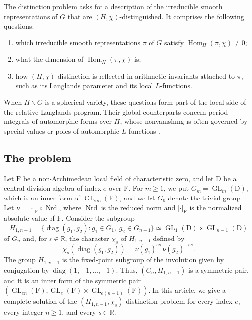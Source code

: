 \documentclass[11pt]{amsart}
\numberwithin{equation}{section}
\theoremstyle{plain}
\theoremstyle{definition}
\theoremstyle{remark}
\newcommand{\R}{\mathbb{R}}
\DeclareMathOperator{\GL}{GL}
\DeclareMathOperator{\Hom}{Hom}
\DeclareMathOperator{\Nrd}{Nrd}
\DeclareMathOperator{\diag}{diag}
\begin{document}
The distinction problem asks for a description of the irreducible smooth representations of $G$ that are $(H,\chi)$-distinguished. It comprises the following questions:
\begin{enumerate}[label=\textup{(\roman*)}]
\item which irreducible smooth representations $\pi$ of $G$ satisfy $\Hom_H(\pi,\chi)\ne0$;
\item what the dimension of $\Hom_H(\pi,\chi)$ is;
\item how $(H,\chi)$-distinction is reflected in arithmetic invariants attached to $\pi$, such as its Langlands parameter and its local $L$-functions.
\end{enumerate}
When $H\backslash G$ is a spherical variety, these questions form part of the local side of the relative Langlands program. Their global counterparts concern period integrals of automorphic forms over $H$, whose nonvanishing is often governed by special values or poles of automorphic $L$-functions \cite{FJ93}.

\subsection{The problem}

Let $\mathrm{F}$ be a non-Archimedean local field of characteristic zero, and let $\mathrm{D}$ be a central division algebra of index $e$ over $\mathrm{F}$. For $m\ge1$, we put $G_m=\GL_m(\mathrm{D})$, which is an inner form of $\GL_{em}(\mathrm{F})$, and we let $G_0$ denote the trivial group. Let $\nu=|\cdot|_{\mathrm{F}}\circ\Nrd$, where $\Nrd$ is the reduced norm and $|\cdot|_{\mathrm{F}}$ is the normalized absolute value of $\mathrm{F}$. Consider the subgroup
$$H_{1,n-1}=\{\diag(g_1,g_2):g_1\in G_1,\ g_2\in G_{n-1}\}\simeq\GL_1(\mathrm{D})\times\GL_{n-1}(\mathrm{D})
$$
of $G_n$ and, for $s\in\R$, the character $\chi_s$ of $H_{1,n-1}$ defined by
$$\chi_s(\diag(g_1,g_2))=\nu(g_1)^{es}\,\nu(g_2)^{-es}.$$
The group $H_{1,n-1}$ is the fixed-point subgroup of the involution given by conjugation by $\diag(1,-1,\dots,-1)$. Thus, $(G_n,H_{1,n-1})$ is a symmetric pair, and it is an inner form of the symmetric pair $(\GL_{en}(\mathrm{F}),\GL_e(\mathrm{F})\times\GL_{e(n-1)}(\mathrm{F}))$. In this article, we give a complete solution of the $(H_{1,n-1},\chi_s)$-distinction problem for every index $e$, every integer $n\ge1$, and every $s\in\R$.
\end{document}
